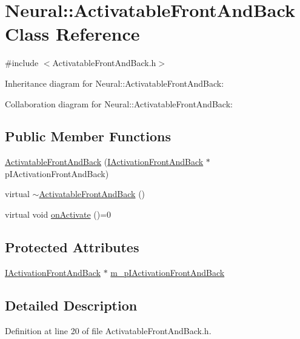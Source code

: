 \hypertarget{class_neural_1_1_activatable_front_and_back}{
\section{Neural::ActivatableFrontAndBack Class Reference}
\label{class_neural_1_1_activatable_front_and_back}
}


{\ttfamily \#include $<$ActivatableFrontAndBack.h$>$}



Inheritance diagram for Neural::ActivatableFrontAndBack:


Collaboration diagram for Neural::ActivatableFrontAndBack:
\subsection*{Public Member Functions}
\begin{DoxyCompactItemize}
\item 
\hyperlink{class_neural_1_1_activatable_front_and_back_ae603988e4736d14d6cc7aa7f63f9e716}{ActivatableFrontAndBack} (\hyperlink{class_neural_1_1_i_activation_front_and_back}{IActivationFrontAndBack} $\ast$pIActivationFrontAndBack)
\item 
virtual \hyperlink{class_neural_1_1_activatable_front_and_back_abb67257471d9582925dc5e5ebd7a8ccb}{$\sim$ActivatableFrontAndBack} ()
\item 
virtual void \hyperlink{class_neural_1_1_activatable_front_and_back_a33bca175c52c5e0d4590496147bd1e0b}{onActivate} ()=0
\end{DoxyCompactItemize}
\subsection*{Protected Attributes}
\begin{DoxyCompactItemize}
\item 
\hyperlink{class_neural_1_1_i_activation_front_and_back}{IActivationFrontAndBack} $\ast$ \hyperlink{class_neural_1_1_activatable_front_and_back_a07057f1cb9fcc16f0d51ae452e251087}{m\_\-pIActivationFrontAndBack}
\end{DoxyCompactItemize}


\subsection{Detailed Description}


Definition at line 20 of file ActivatableFrontAndBack.h.



